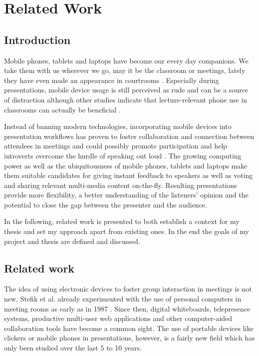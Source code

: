 \chapter{Related Work}
\label{cha:related-work}

\section{Introduction}
Mobile phones, tablets and laptops have become our every day companions. We take them with us wherever we go, may it be the classroom or meetings, lately they have even made an appearance in courtrooms \cite{Farrell:TrialByTablet}. Especially during presentations, mobile device usage is still perceived as rude and can be a source of distraction \cite{Bohmer:SmartphoneUseRude, Bajko:ComparativePerceptionSmartphoneMeeting, Kuznekoff:ImpactPhoneStudentLearning} although other studies indicate that lecture-relevant phone use in classrooms can actually be beneficial \cite{Kuznekoff:MobilePhoneClassroomTwitter}.

Instead of banning modern technologies, incorporating mobile devices into presentation workflows has proven to foster collaboration and connection between attendees in meetings \cite{Bohmer:SmartphoneUseRude} and could possibly promote participation and help introverts overcome the hurdle of speaking out loud \cite{Bry:Backstage}. The growing computing power as well as the ubiquitousness of mobile phones, tablets and laptops make them suitable candidates for giving instant feedback to speakers as well as voting and sharing relevant multi-media content on-the-fly. Resulting presentations provide more flexibility, a better understanding of the listeners' opinion and the potential to close the gap between the presenter and the audience.

In the following, related work is presented to both establish a context for my thesis and set my approach apart from existing ones. In the end the goals of my project and thesis are defined and discussed.

\section{Related work}

The idea of using electronic devices to foster group interaction in meetings is not new. Stefik et al. already experimented with the use of personal computers in meeting rooms as early as in 1987 \cite{Stefik:BeyondTheChalkboard}. Since then, digital whiteboards, telepresence systems, productive multi-user web applications and other computer-aided collaboration tools have become a common sight. The use of portable devices like clickers or mobile phones in presentations, however, is a fairly new field which has only been studied over the last 5 to 10 years.

